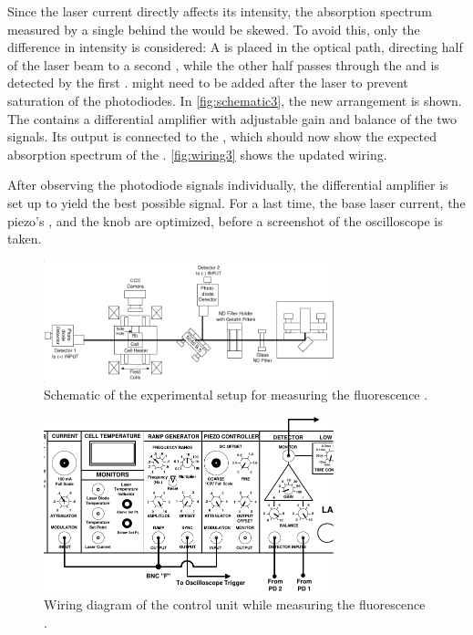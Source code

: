 Since the laser current directly affects its intensity,
the absorption spectrum measured by a single  behind the  would be skewed.
To avoid this,
only the difference in intensity is considered:
A  is placed in the optical path,
directing half of the laser beam to a second ,
while the other half passes through the  and is detected by the first .
 might need to be added after the laser to prevent saturation of the photodiodes.
In \autoref{fig:schematic3}, the new arrangement is shown.
The  contains a differential amplifier with adjustable gain and balance of the two signals.
Its output is connected to the ,
which should now show the expected absorption spectrum of the .
\autoref{fig:wiring3} shows the updated wiring.

After observing the photodiode signals individually,
the differential amplifier is set up to yield the best possible signal.
For a last time,
    the base laser current,
    the piezo's , %
    and the  knob
are optimized,
before a screenshot of the oscilloscope is taken.

\begin{figure}
    \centering
    \includegraphics[width=0.75\textwidth]{content/img/p40_Fig12.pdf}
    \caption{Schematic of the experimental setup for measuring the  fluorescence \cite{versuchsanleitung}.}
    \label{fig:schematic3}
\end{figure}

\begin{figure}
    \centering
    \includegraphics[width=0.75\textwidth]{content/img/p40_Fig13.pdf}
    \caption{Wiring diagram of the control unit while measuring the  fluorescence \cite{versuchsanleitung}.}
    \label{fig:wiring3}
\end{figure}
